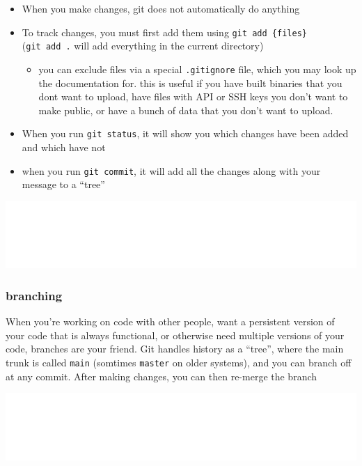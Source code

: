 \documentclass[
]{article}
\providecommand{\tightlist}{%
  \setlength{\itemsep}{0pt}\setlength{\parskip}{0pt}}
\begin{document}
\begin{itemize}
\tightlist
\item
  When you make changes, git does not automatically do anything
\item
  To track changes, you must first add them using
  \texttt{git\ add\ \{files\}} (\texttt{git\ add\ .} will add everything
  in the current directory)

  \begin{itemize}
  \tightlist
  \item
    you can exclude files via a special \texttt{.gitignore} file, which
    you may look up the documentation for. this is useful if you have
    built binaries that you dont want to upload, have files with API or
    SSH keys you don't want to make public, or have a bunch of data that
    you don't want to upload.
  \end{itemize}
\item
  When you run \texttt{git\ status}, it will show you which changes have
  been added and which have not
\item
  when you run \texttt{git\ commit}, it will add all the changes along
  with your message to a ``tree''
\end{itemize}

\includegraphics{mermaid-images/20b80f24a3a6ddcdc2db54e00763d5117b2df660.png}

\hypertarget{branching}{%
\subsubsection{branching}\label{branching}}

When you're working on code with other people, want a persistent version
of your code that is always functional, or otherwise need multiple
versions of your code, branches are your friend. Git handles history as
a ``tree'', where the main trunk is called \texttt{main} (somtimes
\texttt{master} on older systems), and you can branch off at any commit.
After making changes, you can then re-merge the branch

\includegraphics{mermaid-images/74e31f8c420d1a7efbaf236e6b27b99455a87800.png}
\end{document}
